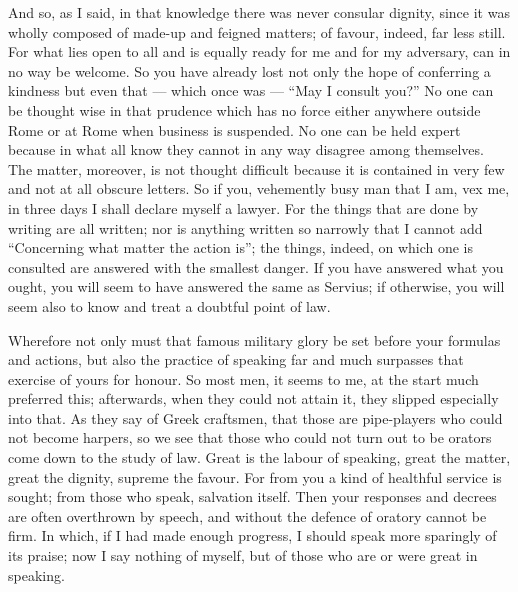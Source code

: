  And so, as I said, in that knowledge there was never consular dignity, since it was wholly composed of made-up and feigned matters; of favour, indeed, far less still. For what lies open to all and is equally ready for me and for my adversary, can in no way be welcome. So you have already lost not only the hope of conferring a kindness but even that --- which once was --- ``May I consult you?'' No one can be thought wise in that prudence which has no force either anywhere outside Rome or at Rome when business is suspended. No one can be held expert because in what all know they cannot in any way disagree among themselves. The matter, moreover, is not thought difficult because it is contained in very few and not at all obscure letters. So if you, vehemently busy man that I am, vex me, in three days I shall declare myself a lawyer. For the things that are done by writing are all written; nor is anything written so narrowly that I cannot add ``Concerning what matter the action is''; the things, indeed, on which one is consulted are answered with the smallest danger. If you have answered what you ought, you will seem to have answered the same as Servius; if otherwise, you will seem also to know and treat a doubtful point of law.

 Wherefore not only must that famous military glory be set before your formulas and actions, but also the practice of speaking far and much surpasses that exercise of yours for honour. So most men, it seems to me, at the start much preferred this; afterwards, when they could not attain it, they slipped especially into that. As they say of Greek craftsmen, that those are pipe-players who could not become harpers, so we see that those who could not turn out to be orators come down to the study of law. Great is the labour of speaking, great the matter, great the dignity, supreme the favour. For from you a kind of healthful service is sought; from those who speak, salvation itself. Then your responses and decrees are often overthrown by speech, and without the defence of oratory cannot be firm. In which, if I had made enough progress, I should speak more sparingly of its praise; now I say nothing of myself, but of those who are or were great in speaking.

